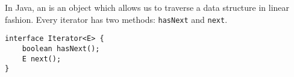 In Java, an  is an object which allows us to traverse a data structure in linear fashion. Every iterator has two methods: \texttt{hasNext} and \texttt{next}.

\begin{lstlisting}
interface Iterator<E> {
    boolean hasNext();
    E next();
}
\end{lstlisting}